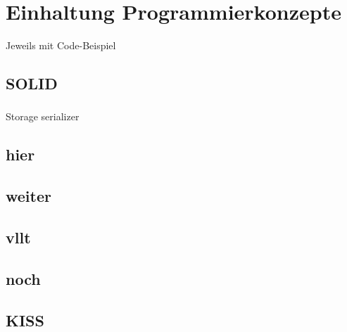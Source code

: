 
\section{Einhaltung Programmierkonzepte}

Jeweils mit Code-Beispiel

\subsection{SOLID}
\subsubsection{\textPrincipleSingleResponsibility}
\label{\textPrincipleSingleResponsibility}
Storage serializer

\subsubsection{\textPrincipleOpenClosed}
\label{\textPrincipleOpenClosed}

\subsubsection{\textPrincipleLiskovSubstitution}
\label{\textPrincipleLiskovSubstitution}


\subsubsection{\textPrincipleInterfaceSegregation}
\label{\textPrincipleInterfaceSegregation}

\subsubsection{\textPrincipleDependencyInversion}
\label{\textPrincipleDependencyInversion}

\subsection{hier}
\subsection{weiter}
\subsection{vllt}
\subsection{noch}
\subsection{KISS}